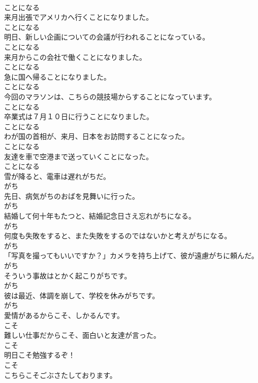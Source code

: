 \documentclass[8pt]{extreport}
\begin{document}
\begin{CJK}{UTF8}{min}
\\	ことになる	
\\	来月出張でアメリカへ行くことになりました。	
\\	ことになる	
\\	明日、新しい企画についての会議が行われることになっている。	
\\	ことになる	
\\	来月からこの会社で働くことになりました。	
\\	ことになる	
\\	急に国へ帰ることになりました。	
\\	ことになる	
\\	今回のマラソンは、こちらの競技場からすることになっています。	
\\	ことになる	
\\	卒業式は７月１０日に行うことになりました。	
\\	ことになる	
\\	わが国の首相が、来月、日本をお訪問することになった。	
\\	ことになる	
\\	友達を車で空港まで送っていくことになった。	
\\	ことになる	
\\	雪が降ると、電車は遅れがちだ。	
\\	がち	
\\	先日、病気がちのおばを見舞いに行った。	
\\	がち	
\\	結婚して何十年もたつと、結婚記念日さえ忘れがちになる。	
\\	がち	
\\	何度も失敗をすると、また失敗をするのではないかと考えがちになる。	
\\	がち	
\\	「写真を撮ってもいいですか？」カメラを持ち上げて、彼が遠慮がちに頼んだ。	
\\	がち	
\\	そういう事故はとかく起こりがちです。	
\\	がち	
\\	彼は最近、体調を崩して、学校を休みがちです。	
\\	がち	
\\	愛情があるからこそ、しかるんです。	
\\	こそ	
\\	難しい仕事だからこそ、面白いと友達が言った。	
\\	こそ	
\\	明日こそ勉強するぞ！	
\\	こそ	
\\	こちらこそごぶさたしております。	

\end{CJK}
\end{document}
